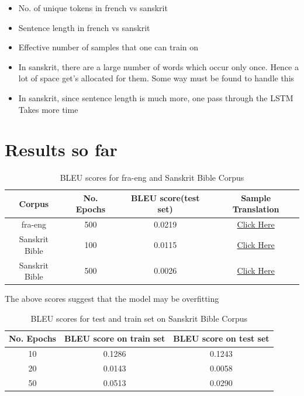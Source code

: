 \documentclass[11pt]{article}
\begin{document}
\begin{itemize}
	\item No. of unique tokens in french vs sanskrit
	\item Sentence length in french vs sanskrit
	\item Effective number of samples that one can train on
	\item In sanskrit, there are a large number of words which occur only once. Hence a lot of space get's allocated for them.
	      Some way must be found to handle this
	\item In sanskrit, since sentence length is much more, one pass through the LSTM Takes more time
\end{itemize}


\section{Results so far}
\begin{table}[H]
	\begin{tabular}{|c|c|c|c|}
		\hline
		Corpus         & No. Epochs & BLEU score(test set) & Sample Translation                                                                                          \\ \hline
		fra-eng        & 500        & 0.0219               & \href{run:/run/user/1000/gvfs/sftp:host=172.16.5.90/home/anirudh/Documents/Code/1522663802.txt}{Click Here} \\ \hline
		Sanskrit Bible & 100        & 0.0115               & \href{run:/run/user/1000/gvfs/sftp:host=172.16.5.90/home/anirudh/Documents/Code/1522733179.txt}{Click Here} \\ \hline
		Sanskrit Bible & 500        & 0.0026               & \href{run:/run/user/1000/gvfs/sftp:host=172.16.5.90/home/anirudh/Documents/Code/1522687677.txt}{Click Here} \\ \hline
	\end{tabular}
	\caption{BLEU scores for fra-eng and Sanskrit Bible Corpus}
\end{table}

The above scores suggest that the model may be overfitting

\begin{table}[H]
	\begin{tabular}{|c|c|c|}
		\hline
		No. Epochs & BLEU score on train set & BLEU score on test set \\ \hline
		10         & 0.1286                  & 0.1243                 \\ \hline
		20         & 0.0143                  & 0.0058                 \\ \hline
		50         & 0.0513                  & 0.0290                 \\ \hline
	\end{tabular}
	\caption{BLEU scores for test and train set on Sanskrit Bible Corpus}
\end{table}
\end{document}
